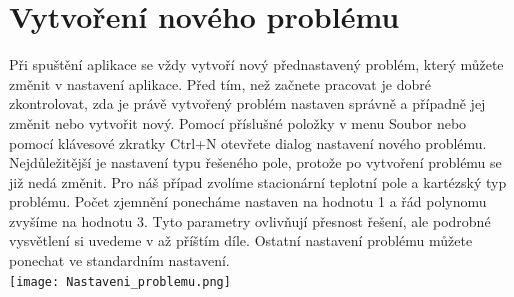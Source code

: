 \documentclass[a4paper, oneside]{article}
\begin{document}
\section{Vytvoření nového problému}
\indent Při spuštění aplikace se vždy vytvoří nový přednastavený problém, který můžete změnit v nastavení aplikace. Před tím, než začnete pracovat je dobré zkontrolovat, zda je právě vytvořený problém nastaven správně a případně jej změnit nebo vytvořit nový. Pomocí příslušné položky v menu Soubor nebo pomocí klávesové zkratky Ctrl+N otevřete dialog nastavení nového problému. Nejdůležitější je nastavení typu řešeného pole, protože po vytvoření problému se již nedá změnit. Pro náš případ zvolíme stacionární teplotní pole a kartézský typ problému. Počet zjemnění ponecháme nastaven na hodnotu 1 a řád polynomu zvyšíme na hodnotu 3. Tyto parametry ovlivňují přesnost řešení, ale podrobné vysvětlení si uvedeme v až příštím díle. Ostatní nastavení problému můžete ponechat ve standardním nastavení.\\
\texttt{[image: Nastaveni\_problemu.png]}\\
\end{document}
